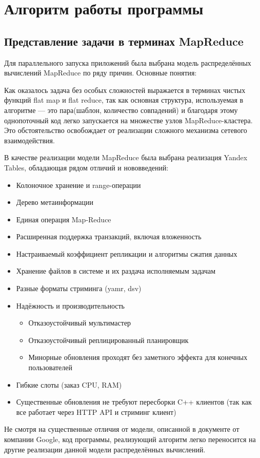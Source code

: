 \section{Алгоритм работы программы}
\subsection{Представление задачи в терминах MapReduce}
Для параллельного запуска приложений была выбрана модель распределённых
вычислений MapReduce по ряду причин. Основные понятия:

Как оказалось задача без особых сложностей выражается в терминах
чистых функций flat map и flat reduce, так как основная структура,
используемая в алгоритме --- это пара(шаблон, количество совпадений)
и благодаря этому однопоточный код легко запускается
на множестве узлов MapReduce-кластера. Это обстоятельство освобождает
от реализации сложного механизма сетевого взаимодействия.

В качестве реализации модели MapReduce была выбрана реализация
Yandex Tables, обладающая рядом отличий и нововведений:
\begin{itemize}
  \item Колоночное хранение и range-операции
  \item Дерево метаинформации
  \item Единая операция Map-Reduce
  \item Расширенная поддержка транзакций, включая вложенность
  \item Настраиваемый коэффициент репликации и алгоритмы сжатия данных
  \item Хранение файлов в системе и их раздача исполняемым задачам
  \item Разные форматы стриминга (yamr, dsv)
  \item Надёжность и производительность
    \begin{itemize}
      \item Отказоустойчивый мультимастер
      \item Отказоустойчивый реплицированный планировщик
      \item Минорные обновления проходят без заметного эффекта для
        конечных пользователей
    \end{itemize}
  \item Гибкие слоты (заказ CPU, RAM)
  \item Существенные обновления не требуют пересборки C++ клиентов
    (так как все работает через HTTP API и стриминг клиент)
\end{itemize}
Не смотря на существенные отличия от модели, описанной в документе от компании
Google, код программы, реализующий алгоритм легко переносится
на другие реализации данной модели распределённых вычислений.

